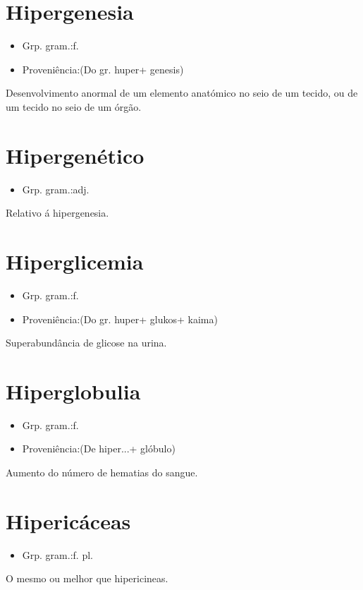 \documentclass{article}
\begin{document}
\section{Hipergenesia}
\begin{itemize}
\item {Grp. gram.:f.}
\end{itemize}
\begin{itemize}
\item {Proveniência:(Do gr. \textunderscore huper\textunderscore  + \textunderscore genesis\textunderscore )}
\end{itemize}
Desenvolvimento anormal de um elemento anatómico no seio de um tecido, ou de um tecido no seio de um órgão.
\section{Hipergenético}
\begin{itemize}
\item {Grp. gram.:adj.}
\end{itemize}
Relativo á hipergenesia.
\section{Hiperglicemia}
\begin{itemize}
\item {Grp. gram.:f.}
\end{itemize}
\begin{itemize}
\item {Proveniência:(Do gr. \textunderscore huper\textunderscore  + \textunderscore glukos\textunderscore  + \textunderscore kaima\textunderscore )}
\end{itemize}
Superabundância de glicose na urina.
\section{Hiperglobulia}
\begin{itemize}
\item {Grp. gram.:f.}
\end{itemize}
\begin{itemize}
\item {Proveniência:(De \textunderscore hiper...\textunderscore  + \textunderscore glóbulo\textunderscore )}
\end{itemize}
Aumento do número de hematias do sangue.
\section{Hipericáceas}
\begin{itemize}
\item {Grp. gram.:f. pl.}
\end{itemize}
O mesmo ou melhor que \textunderscore hipericineas\textunderscore .
\end{document}
